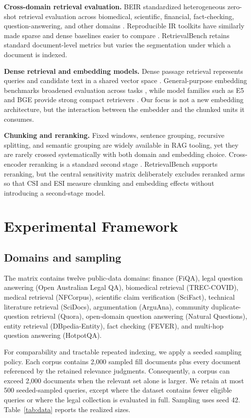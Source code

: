 \documentclass[10pt,letterpaper]{article}
\begin{document}
\textbf{Cross-domain retrieval evaluation.}
BEIR standardized heterogeneous zero-shot retrieval evaluation across biomedical, scientific,
financial, fact-checking, question-answering, and other domains \cite{thakur2021beir}. Reproducible
IR toolkits have similarly made sparse and dense baselines easier to compare \cite{lin2021pyserini}.
RetrievalBench retains standard document-level metrics but varies the segmentation under which a
document is indexed.

\textbf{Dense retrieval and embedding models.}
Dense passage retrieval represents queries and candidate text in a shared vector space
\cite{karpukhin2020dpr}. General-purpose embedding benchmarks broadened evaluation across tasks
\cite{muennighoff2023mteb}, while model families such as E5 and BGE provide strong compact
retrievers \cite{wang2022e5,xiao2023cpack}. Our focus is not a new embedding architecture, but the
interaction between the embedder and the chunked units it consumes.

\textbf{Chunking and reranking.}
Fixed windows, sentence grouping, recursive splitting, and semantic grouping are widely available
in RAG tooling, yet they are rarely crossed systematically with both domain and embedding choice.
Cross-encoder reranking is a standard second stage \cite{nogueira2019passage}. RetrievalBench
supports reranking, but the central sensitivity matrix deliberately excludes reranked arms so that
CSI and ESI measure chunking and embedding effects without introducing a second-stage model.

\section{Experimental Framework}

\subsection{Domains and sampling}

The matrix contains twelve public-data domains: finance (FiQA), legal question answering
(Open Australian Legal QA), biomedical retrieval (TREC-COVID), medical retrieval (NFCorpus),
scientific claim verification (SciFact), technical literature retrieval (SciDocs), argumentation
(ArguAna), community duplicate-question retrieval (Quora), open-domain question answering
(Natural Questions), entity retrieval (DBpedia-Entity), fact checking (FEVER), and multi-hop
question answering (HotpotQA).

For comparability and tractable repeated indexing, we apply a seeded sampling policy. Each corpus
contains 2,000 sampled fill documents plus every document referenced by the retained relevance
judgments. Consequently, a corpus can exceed 2,000 documents when the relevant set alone is
larger. We retain at most 500 seeded-sampled queries, except where the dataset contains fewer
eligible queries or where the legal collection is evaluated in full. Sampling uses seed 42.
Table~\ref{tab:data} reports the realized sizes.
\end{document}
